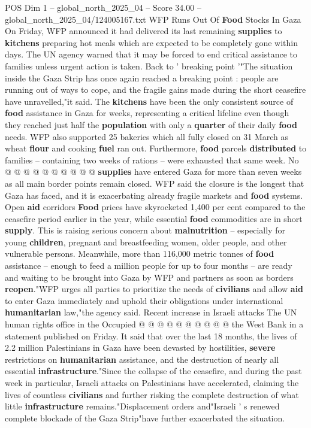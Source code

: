\begin{textsample}{POS Dim 1 – global\_north\_2025\_04 – Score 34.00 – global\_north\_2025\_04/124005167.txt}  \label{ex:f1_pos_342}
WFP Runs Out Of \textbf{Food} Stocks In Gaza On Friday, WFP announced it had delivered its last remaining \textbf{supplies} to \textbf{kitchens} preparing hot meals which are expected to be completely gone within days.
The UN agency warned that it may be forced to end critical assistance to families unless urgent action is taken.
Back to ' breaking point '"The situation inside the Gaza Strip has once again reached a breaking point : people are running out of ways to cope, and the fragile gains made during the short ceasefire have unravelled,"it said.
The \textbf{kitchens} have been the only consistent source of \textbf{food} assistance in Gaza for weeks, representing a critical lifeline even though they reached just half the \textbf{population} with only a \textbf{quarter} of their daily \textbf{food} needs.
WFP also supported 25 bakeries which all fully closed on 31 March as wheat \textbf{flour} and cooking \textbf{fuel} ran out.
Furthermore, \textbf{food} parcels \textbf{distributed} to families -- containing two weeks of rations -- were exhausted that same week.
No @ @ @ @ @ @ @ @ @ @ \textbf{supplies} have entered Gaza for more than seven weeks as all main border points remain closed.
WFP said the closure is the longest that Gaza has faced, and it is exacerbating already fragile markets and \textbf{food} systems.
Open \textbf{aid} corridors \textbf{Food} prices have skyrocketed 1,400 per cent compared to the ceasefire period earlier in the year, while essential \textbf{food} commodities are in short \textbf{supply}.
This is raising serious concern about \textbf{malnutrition} -- especially for young \textbf{children}, pregnant and breastfeeding women, older people, and other vulnerable persons.
Meanwhile, more than 116,000 metric tonnes of \textbf{food} assistance -- enough to feed a million people for up to four months -- are ready and waiting to be brought into Gaza by WFP and partners as soon as borders \textbf{reopen}."WFP urges all parties to prioritize the needs of \textbf{civilians} and allow \textbf{aid} to enter Gaza immediately and uphold their obligations under international \textbf{humanitarian} law,"the agency said.
Recent increase in Israeli attacks The UN human rights office in the Occupied @ @ @ @ @ @ @ @ @ @ the West Bank in a statement published on Friday.
It said that over the last 18 months, the lives of 2.2 million Palestinians in Gaza have been devasted by hostilities, \textbf{severe} restrictions on \textbf{humanitarian} assistance, and the destruction of nearly all essential \textbf{infrastructure}."Since the collapse of the ceasefire, and during the past week in particular, Israeli attacks on Palestinians have accelerated, claiming the lives of countless \textbf{civilians} and further risking the complete destruction of what little \textbf{infrastructure} remains."Displacement orders and"Israeli ' s renewed complete blockade of the Gaza Strip"have further exacerbated the situation.

\end{textsample}
